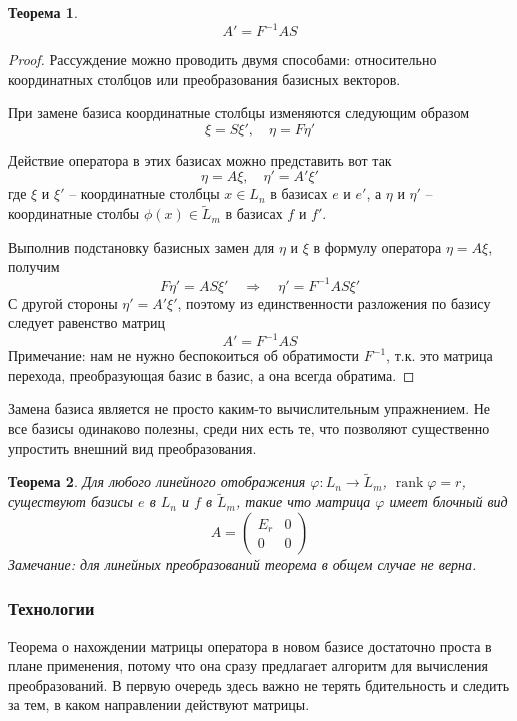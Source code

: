 \documentclass[a4paper,12pt]{article}
\DeclareMathOperator{\rank}{\mathop{rank}}
\newtheorem{theorem}{Теорема}[section]
\begin{document}
\begin{theorem}
	\[	
		A' = F^{-1}AS
	\]
\end{theorem}
\begin{proof}
	Рассуждение можно проводить двумя способами: относительно координатных столбцов или преобразования базисных векторов. 
	
	При замене базиса координатные столбцы изменяются следующим образом
	\[ \xi = S \xi', \quad \eta = F \eta'\]	
	
	Действие оператора в этих базисах можно представить вот так
	\[ \eta = A \xi, \quad \eta' = A'\xi' \]
	где $\xi$ и $\xi'$ -- координатные столбцы $x \in L_n$ в базисах $e$ и $e'$, а $\eta$ и $\eta'$ -- координатные столбы $\phi(x) \in \tilde{L}_m$ в базисах $f$ и $f'$.
	
	Выполнив подстановку базисных замен для $\eta$ и $\xi$ в формулу оператора $\eta = A \xi$, получим
	\[
		F \eta' = AS\xi' \quad  \Rightarrow \quad \eta' = F^{-1}AS \xi'
	\]
	С другой стороны $\eta' = A' \xi'$, поэтому из единственности разложения по базису следует равенство матриц
	\[
		A' = F^{-1} A S
	\]
	Примечание: нам не нужно беспокоиться об обратимости $F^{-1}$, т.к. это матрица перехода, преобразующая базис в базис, а она всегда обратима.
\end{proof}


Замена базиса является не просто каким-то вычислительным упражнением. Не все базисы одинаково полезны, среди них есть те, что позволяют существенно упростить внешний вид преобразования.

\begin{theorem}
	Для любого линейного отображения $\varphi: L_n \to \tilde{L}_m$, $\rank \varphi = r$, существуют базисы $e$ в $L_n$ и $f$ в $\tilde{L}_m$, такие что матрица $\varphi$ имеет блочный вид
	\[
		A = \begin{pmatrix}
			E_r & 0 \\
			0 & 0 
		\end{pmatrix}
	\]	
	Замечание: для линейных преобразований теорема в общем случае не верна.
\end{theorem}

\subsubsection{Технологии}
Теорема о нахождении матрицы оператора в новом базисе достаточно проста в плане применения, потому что она сразу предлагает алгоритм для вычисления преобразований. В первую очередь здесь важно не терять бдительность и следить за тем, в каком направлении действуют матрицы. 
\end{document}
